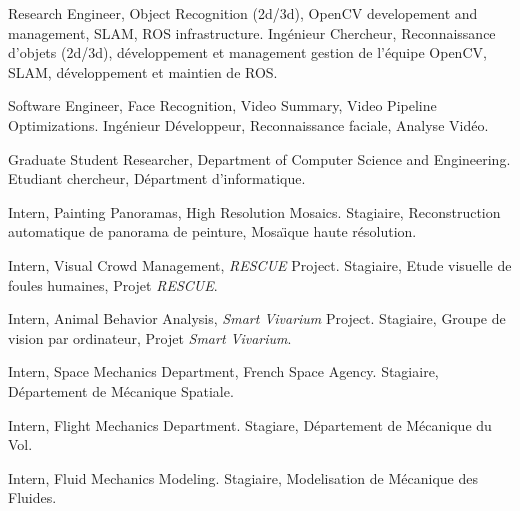 \documentclass{article}
\begin{document}
\begin{llist}
{
Research Engineer, Object Recognition (2d/3d), OpenCV developement and management, SLAM, ROS infrastructure.
}
{
Ing\'{e}nieur Chercheur, Reconnaissance d'objets (2d/3d), d\'{e}veloppement et management gestion de l'\'{e}quipe 
OpenCV, SLAM, d\'{e}veloppement et maintien de ROS.
}

{
Software Engineer, Face Recognition, Video Summary, Video Pipeline
Optimizations.
}
{
Ing\'{e}nieur D\'{e}veloppeur, Reconnaissance faciale, Analyse
Vid\'{e}o.
}

{
Graduate Student Researcher, Department of Computer Science and Engineering.
}
{
Etudiant chercheur, D\'{e}partment d'informatique.
}

{
Intern, Painting Panoramas, High Resolution Mosaics.
}
{
Stagiaire, Reconstruction automatique de panorama de peinture, Mosa\"{\i}que haute r\'{e}solution.
}

{
Intern, Visual Crowd Management, {\em RESCUE} Project.
}
{
Stagiaire, Etude visuelle de foules humaines, Projet {\em RESCUE}.
}

{
Intern, Animal Behavior Analysis, {\em Smart Vivarium} Project.
}
{
Stagiaire, Groupe de vision par ordinateur, Projet {\em Smart Vivarium}.
}

{
Intern, Space Mechanics Department, French Space Agency.
}
{
Stagiaire, D\'{e}partement de M\'{e}canique Spatiale.
}

 
{
Intern, Flight Mechanics Department.
}
{
Stagiare, D\'{e}partement de M\'{e}canique du Vol.
}

 
{
Intern, Fluid Mechanics Modeling.
}
{
Stagiaire, Modelisation de M\'{e}canique des Fluides.
}


\end{llist}
\end{document}
